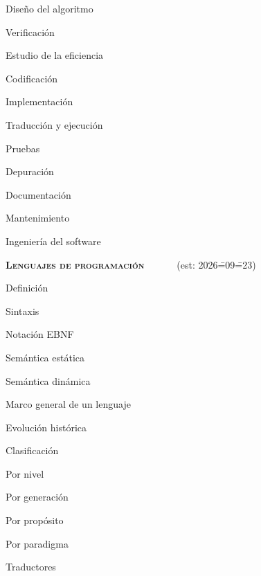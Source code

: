 \begin{longenum}
\begin{longenum}
\begin{longenum}
            \item Diseño del algoritmo
            \item Verificación
            \item Estudio de la eficiencia
            \item Codificación
            \begin{longenum}
                \item Implementación
            \end{longenum}
            \item Traducción y ejecución
            \item Pruebas
            \item Depuración
            \item Documentación
            \item Mantenimiento
            \item Ingeniería del software
        \end{longenum}
    \end{longenum}
    \item \textbf{\textsc{Lenguajes de programación}} \ \ \ \ \ \ (est: 2026\==09\==23)
    \begin{longenum}
        \item Definición
        \begin{longenum}
            \item Sintaxis
            \begin{longenum}
                \item Notación EBNF
            \end{longenum}
            \item Semántica estática
            \item Semántica dinámica
            \item Marco general de un lenguaje
        \end{longenum}
        \item Evolución histórica \opcional\
        \item Clasificación
        \begin{longenum}
            \item Por nivel
            \item Por generación
            \item Por propósito
            \item Por paradigma
        \end{longenum}
        \item Traductores

\end{longenum}
\end{longenum}
